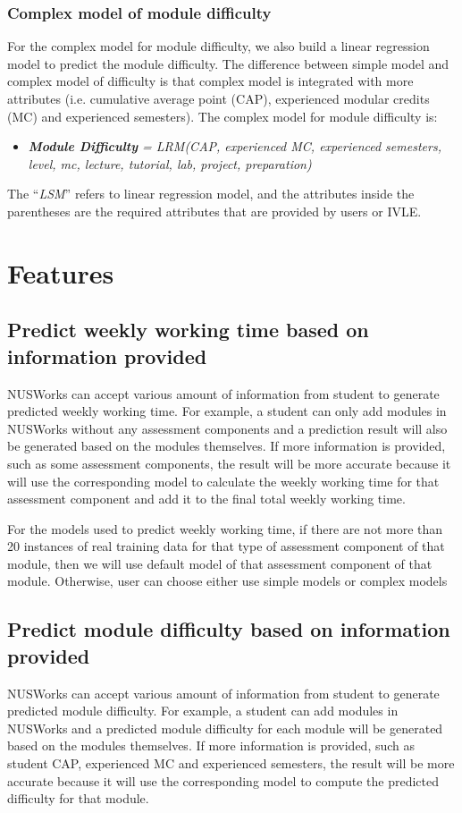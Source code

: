 \documentclass[fyp]{socreport}
\begin{document}
\subsubsection{Complex model of module difficulty}
For the complex model for module difficulty, we also build a linear regression model to predict the module difficulty. The difference between simple model and complex model of difficulty is that complex model is integrated with more attributes (i.e. cumulative average point (CAP), experienced modular credits (MC) and experienced semesters). The complex model for module difficulty is:
\begin{itemize}
	\item \textit{\textbf{Module Difficulty} = LRM(CAP, experienced MC, experienced semesters, level, mc, lecture, tutorial, lab, project, preparation)}
\end{itemize}

The “\textit{LSM}” refers to linear regression model, and the attributes inside the parentheses are the required attributes that are provided by users or IVLE.

\section{Features}
\subsection{Predict weekly working time based on information provided}
NUSWorks can accept various amount of information from student to generate predicted weekly working time. For example, a student can only add modules in NUSWorks without any assessment components and a prediction result will also be generated based on the modules themselves. If more information is provided, such as some assessment components, the result will be more accurate because it will use the corresponding model to calculate the weekly working time for that assessment component and add it to the final total weekly working time.

For the models used to predict weekly working time, if there are not more than 20 instances of real training data for that type of assessment component of that module, then we will use default model of that assessment component of that module. Otherwise, user can choose either use simple models or complex models

\subsection{Predict module difficulty based on information provided}
NUSWorks can accept various amount of information from student to generate predicted module difficulty. For example, a student can add modules in NUSWorks and a predicted module difficulty for each module will be generated based on the modules themselves. If more information is provided, such as student CAP, experienced MC and experienced semesters, the result will be more accurate because it will use the corresponding model to compute the predicted difficulty for that module.
\end{document}
